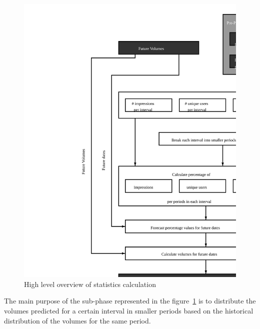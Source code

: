 \begin{figure}[h] \begin{center} \leavevmode
\includegraphics[]{calculate_stats} \caption{ High level overview
of statistics calculation} \label{fig:calculate_stats_ii} \end{center} \end{figure}

The main purpose of the sub-phase represented in the figure~\ref{fig:calculate_stats_ii} is
to distribute the volumes predicted for a certain interval in smaller periods
based on the historical distribution of the volumes for the same period.

